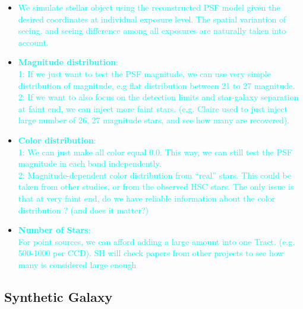\documentclass[preprint]{aastex}
\newcommand{\plan}[1]{\textcolor{cyan}{#1}}
\begin{document}
    \begin{itemize}
        \item \plan{We simulate stellar object using the reconstructed PSF model given 
                    the desired coordinates at individual exposure level.  
                    The spatial variantion of seeing, and seeing difference among all 
                    exposures are naturally taken into account.}
        \item \plan{\textbf{Magnitude distribution}: \\ 
                    1: If we just want to test the PSF magnitude, we can use very 
                           simple distribution of magnitude, e.g flat distribution 
                           between 21 to 27 magnitude. \\
                    2: If we want to also focus on the detection limits and 
                           star-galaxy separation at faint end, we can inject more 
                           faint stars.  (e.g. Claire used to just inject large number 
                           of 26, 27 magnitude stars, and see how many are recovered).}
        \item \plan{\textbf{Color distribution}: \\
                    1: We can just make all color equal 0.0. This way, we can still 
                       test the PSF magnitude in each band independently. \\ 
                    2: Magnitude-dependent color distribution from ``real'' stars. 
                       This could be taken from other studies, or from the observed
                       HSC stars.  The only issue is that at very faint end, do we have
                       reliable information about the color distribution ? 
                       (and does it matter?)}
        \item \plan{\textbf{Number of Stars}: \\
                    For point sources, we can afford adding a large amount into one Tract. 
                    (e.g. 500-1000 per CCD). 
                    SH will check papers from other projects to see how many is considered 
                    large enough}
    \end{itemize}
    
    
\subsection{Synthetic Galaxy}
\end{document}

